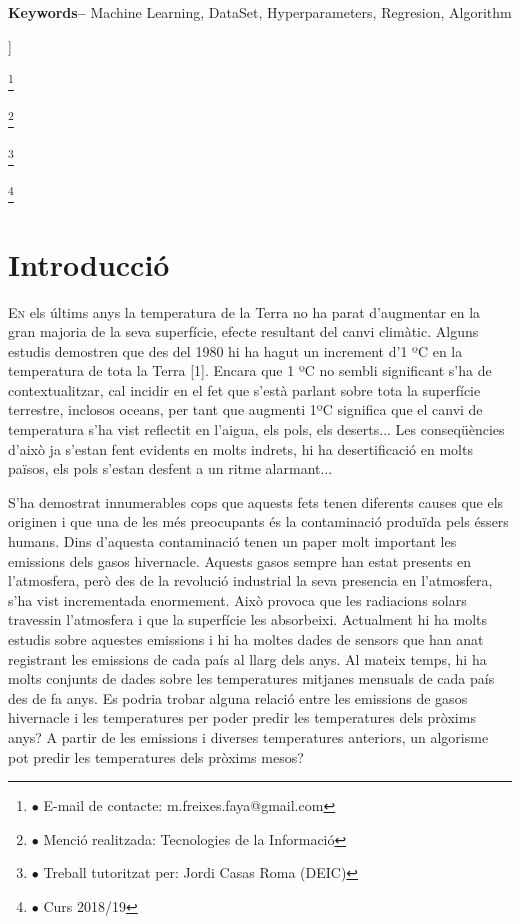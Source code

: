 \documentclass[10pt,a4paper,twocolumn,twoside]{article}
\newcommand\blfootnote[1]{%
  \begingroup
  \renewcommand\thefootnote{}\footnote{#1}%
  \addtocounter{footnote}{-1}%
  \endgroup
}
\begin{document}
\begin{@twocolumnfalse}
\begin{center}
{\\
\\
\textbf{Keywords-- } Machine Learning, DataSet, Hyperparameters, Regresion, Algorithm\\
}

\bigskip

{\vrule depth 0pt height 0.5pt width 4cm\hspace{7.5pt}%
%
\hspace{7.5pt}\vrule depth 0pt height 0.5pt width 4cm\relax}

\end{center}

\bigskip
\end{@twocolumnfalse}]

\blfootnote{$\bullet$ E-mail de contacte: m.freixes.faya@gmail.com}
\blfootnote{$\bullet$ Menció realitzada: Tecnologies de la Informació}
\blfootnote{$\bullet$ Treball tutoritzat per: Jordi Casas Roma (DEIC)}
\blfootnote{$\bullet$ Curs 2018/19}
\section{Introducció}
\lettrine[lines=3]{E}{n} els últims anys la temperatura de la Terra no ha parat d'augmentar en la gran majoria de la seva superfície, efecte resultant del canvi climàtic. Alguns estudis demostren que des del 1980 hi ha hagut un increment d'1 ºC en la temperatura de tota la Terra [1]. Encara que 1 ºC no sembli significant s'ha de contextualitzar, cal incidir en el fet que s'està parlant sobre tota la superfície terrestre, inclosos oceans, per tant que augmenti 1ºC significa que el canvi de temperatura s'ha vist reflectit en l'aigua, els pols, els deserts... Les conseqüències d'això ja s'estan fent evidents en molts indrets, hi ha desertificació en molts països, els pols s'estan desfent a un ritme alarmant...

S'ha demostrat innumerables cops que aquests fets tenen diferents causes que els originen i que una de les més preocupants és la contaminació produïda pels éssers humans. Dins d'aquesta contaminació tenen un paper molt important les emissions dels gasos hivernacle. Aquests gasos sempre han estat presents en l'atmosfera, però des de la revolució industrial la seva presencia en l'atmosfera, s'ha vist incrementada enormement. Això provoca que les radiacions solars travessin l'atmosfera i que la superfície les absorbeixi. Actualment hi ha molts estudis sobre aquestes emissions i hi ha moltes dades de sensors que han anat registrant les emissions de cada país al llarg dels anys. Al mateix temps, hi ha molts conjunts de dades sobre les temperatures mitjanes mensuals de cada país des de fa anys. Es podria trobar alguna relació entre les emissions de gasos hivernacle i les temperatures per poder predir les temperatures dels pròxims anys? A partir de les emissions i diverses temperatures anteriors, un algorisme pot predir les temperatures dels pròxims mesos?
\end{document}
